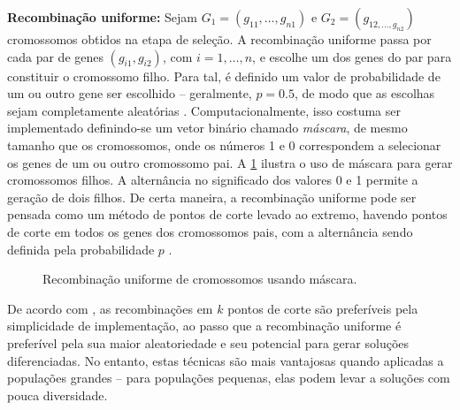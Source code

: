 \textbf{Recombinação uniforme:} Sejam $G_1 = (g_{11}, \dots, g_{n1})$ e $G_2 = (g_{12, \dots, g_{n2}})$ cromossomos obtidos na etapa de seleção. A recombinação uniforme passa por cada par de genes $(g_{i1}, g_{i2})$, com $i = 1, \dots, n$, e escolhe um dos genes do par para constituir o cromossomo filho. Para tal, é definido um valor de probabilidade de um ou outro gene ser escolhido -- geralmente, $p = 0.5$, de modo que as escolhas sejam completamente aleatórias \cite{SASTRY2005}. Computacionalmente, isso costuma ser implementado definindo-se um vetor binário chamado \emph{máscara}, de mesmo tamanho que os cromossomos, onde os números 1 e 0 correspondem a selecionar os genes de um ou outro cromossomo pai. A \cref{fig:recombinação uniforme} ilustra o uso de máscara para gerar cromossomos filhos. A alternância no significado dos valores 0 e 1 permite a geração de dois filhos. De certa maneira, a recombinação uniforme pode ser pensada como um método de pontos de corte levado ao extremo, havendo pontos de corte em todos os genes dos cromossomos pais, com a alternância sendo definida pela probabilidade $p$ \cite{BARCELLOS2000}.

\begin{figure}[ht]
    \centering
    \caption{Recombinação uniforme de cromossomos usando máscara.}
    \label{fig:recombinação uniforme}
\end{figure}

De acordo com \textcite{KATOCH2021}, as recombinações em $k$ pontos de corte são preferíveis pela simplicidade de implementação, ao passo que a recombinação uniforme é preferível pela sua maior aleatoriedade e seu potencial para gerar soluções diferenciadas. No entanto, estas técnicas são mais vantajosas quando aplicadas a populações grandes -- para populações pequenas, elas podem levar a soluções com pouca diversidade.

